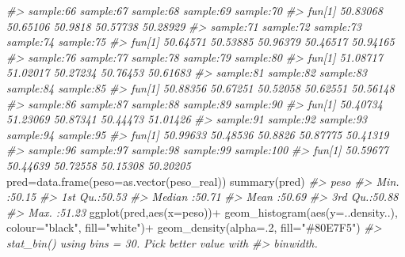 \documentclass[
]{book}
\newenvironment{Shaded}{\begin{snugshade}}{\end{snugshade}}
\newcommand{\AttributeTok}[1]{\textcolor[rgb]{0.77,0.63,0.00}{#1}}
\newcommand{\CommentTok}[1]{\textcolor[rgb]{0.56,0.35,0.01}{\textit{#1}}}
\newcommand{\DecValTok}[1]{\textcolor[rgb]{0.00,0.00,0.81}{#1}}
\newcommand{\FunctionTok}[1]{\textcolor[rgb]{0.00,0.00,0.00}{#1}}
\newcommand{\NormalTok}[1]{#1}
\newcommand{\OtherTok}[1]{\textcolor[rgb]{0.56,0.35,0.01}{#1}}
\newcommand{\SpecialCharTok}[1]{\textcolor[rgb]{0.00,0.00,0.00}{#1}}
\newcommand{\StringTok}[1]{\textcolor[rgb]{0.31,0.60,0.02}{#1}}
\begin{document}
\begin{Shaded}
\begin{Highlighting}[]
\CommentTok{\#\textgreater{}        sample:66 sample:67 sample:68 sample:69 sample:70}
\CommentTok{\#\textgreater{} fun[1]  50.83068  50.65106   50.9818  50.57738  50.28929}
\CommentTok{\#\textgreater{}        sample:71 sample:72 sample:73 sample:74 sample:75}
\CommentTok{\#\textgreater{} fun[1]  50.64571  50.53885  50.96379  50.46517  50.94165}
\CommentTok{\#\textgreater{}        sample:76 sample:77 sample:78 sample:79 sample:80}
\CommentTok{\#\textgreater{} fun[1]  51.08717  51.02017  50.27234  50.76453  50.61683}
\CommentTok{\#\textgreater{}        sample:81 sample:82 sample:83 sample:84 sample:85}
\CommentTok{\#\textgreater{} fun[1]  50.88356  50.67251  50.52058  50.62551  50.56148}
\CommentTok{\#\textgreater{}        sample:86 sample:87 sample:88 sample:89 sample:90}
\CommentTok{\#\textgreater{} fun[1]  50.40734  51.23069  50.87341  50.44473  51.01426}
\CommentTok{\#\textgreater{}        sample:91 sample:92 sample:93 sample:94 sample:95}
\CommentTok{\#\textgreater{} fun[1]  50.99633  50.48536   50.8826  50.87775  50.41319}
\CommentTok{\#\textgreater{}        sample:96 sample:97 sample:98 sample:99 sample:100}
\CommentTok{\#\textgreater{} fun[1]  50.59677  50.44639  50.72558  50.15308   50.20205}
\NormalTok{pred}\OtherTok{=}\FunctionTok{data.frame}\NormalTok{(}\AttributeTok{peso=}\FunctionTok{as.vector}\NormalTok{(peso\_real))}
\FunctionTok{summary}\NormalTok{(pred)}
\CommentTok{\#\textgreater{}       peso      }
\CommentTok{\#\textgreater{}  Min.   :50.15  }
\CommentTok{\#\textgreater{}  1st Qu.:50.53  }
\CommentTok{\#\textgreater{}  Median :50.71  }
\CommentTok{\#\textgreater{}  Mean   :50.69  }
\CommentTok{\#\textgreater{}  3rd Qu.:50.88  }
\CommentTok{\#\textgreater{}  Max.   :51.23}
\FunctionTok{ggplot}\NormalTok{(pred,}\FunctionTok{aes}\NormalTok{(}\AttributeTok{x=}\NormalTok{peso))}\SpecialCharTok{+}
  \FunctionTok{geom\_histogram}\NormalTok{(}\FunctionTok{aes}\NormalTok{(}\AttributeTok{y=}\NormalTok{..density..), }\AttributeTok{colour=}\StringTok{"black"}\NormalTok{, }\AttributeTok{fill=}\StringTok{"white"}\NormalTok{)}\SpecialCharTok{+}
  \FunctionTok{geom\_density}\NormalTok{(}\AttributeTok{alpha=}\NormalTok{.}\DecValTok{2}\NormalTok{, }\AttributeTok{fill=}\StringTok{"\#80E7F5"}\NormalTok{) }
\CommentTok{\#\textgreater{} \textasciigrave{}stat\_bin()\textasciigrave{} using \textasciigrave{}bins = 30\textasciigrave{}. Pick better value with}
\CommentTok{\#\textgreater{} \textasciigrave{}binwidth\textasciigrave{}.}
\end{Highlighting}
\end{Shaded}
\end{document}
